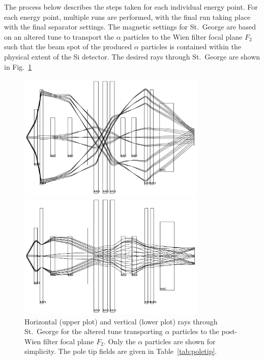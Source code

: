 The process below describes the steps taken for each individual energy
point. For each energy point, multiple runs are performed, with the
final run taking place with the final separator settings. The magnetic
settings for St.\ George are based on an altered tune to transport the
$\alpha$ particles to the Wien filter focal plane $F_2$ such that the
beam spot of the produced $\alpha$ particles is contained within the
physical extent of the Si detector. The desired rays through St.\ George
are shown in Fig.~\ref{fig:raytrace-altered}

\begin{figure}
    \begin{center}
        \centerline{
            \includegraphics[width=0.8\textwidth]{figures/optimal_tune_x.png}}
        \centerline{
            \includegraphics[width=0.8\textwidth]{figures/optimal_tune_y.png}}
        \caption[Horizontal and vertical rays through St.\
            George for $\alpha$ particles]{Horizontal (upper plot) and
            vertical (lower plot) rays through St.\ George for the
            altered tune transporting $\alpha$ particles to the
            post-Wien filter focal plane $F_2$. Only the $\alpha$
            particles are shown for simplicity. The pole tip fields are
            given in Table~\ref{tab:poletip}.}
        \label{fig:raytrace-altered}
    \end{center}
\end{figure}

